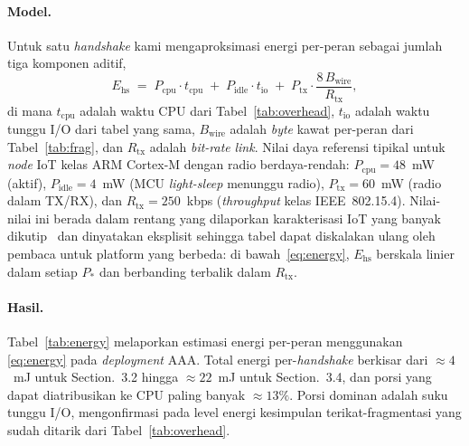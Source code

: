 \documentclass{easychair}
\newcommand{\VarSecShort}[1]{Section.~#1}
\begin{document}
\paragraph{Model.} Untuk satu \emph{handshake} kami mengaproksimasi
energi per-peran sebagai jumlah tiga komponen aditif,
\begin{equation}
E_{\mathrm{hs}} \;=\; P_{\mathrm{cpu}}\cdot t_{\mathrm{cpu}}
\;+\; P_{\mathrm{idle}}\cdot t_{\mathrm{io}}
\;+\; P_{\mathrm{tx}}\cdot \frac{8\,B_{\mathrm{wire}}}{R_{\mathrm{tx}}},
\label{eq:energy}
\end{equation}
di mana $t_{\mathrm{cpu}}$ adalah waktu CPU dari
Tabel~\ref{tab:overhead}, $t_{\mathrm{io}}$ adalah waktu tunggu I/O
dari tabel yang sama, $B_{\mathrm{wire}}$ adalah \emph{byte} kawat
per-peran dari Tabel~\ref{tab:frag}, dan $R_{\mathrm{tx}}$ adalah
\emph{bit-rate} \emph{link}. Nilai daya referensi tipikal untuk
\emph{node} IoT kelas ARM Cortex-M dengan radio berdaya-rendah:
$P_{\mathrm{cpu}}\!=\!48$~mW (aktif),
$P_{\mathrm{idle}}\!=\!4$~mW (MCU \emph{light-sleep} menunggu radio),
$P_{\mathrm{tx}}\!=\!60$~mW (radio dalam TX/RX), dan
$R_{\mathrm{tx}}\!=\!250$~kbps (\emph{throughput} kelas IEEE~802.15.4).
Nilai-nilai ini berada dalam rentang yang dilaporkan karakterisasi
IoT yang banyak dikutip~\cite{FVW24,FTK+25} dan dinyatakan eksplisit
sehingga tabel dapat diskalakan ulang oleh pembaca untuk platform
yang berbeda: di bawah~\eqref{eq:energy}, $E_{\mathrm{hs}}$ berskala
linier dalam setiap $P_*$ dan berbanding terbalik dalam
$R_{\mathrm{tx}}$.

\paragraph{Hasil.} Tabel~\ref{tab:energy} melaporkan estimasi energi
per-peran menggunakan \eqref{eq:energy} pada \emph{deployment} AAA.
Total energi per-\emph{handshake} berkisar dari $\approx\!4$~mJ untuk
\VarSecShort{3.2} hingga $\approx\!22$~mJ untuk \VarSecShort{3.4}, dan
porsi yang dapat diatribusikan ke CPU paling banyak $\approx\!13\%$.
Porsi dominan adalah suku tunggu I/O, mengonfirmasi pada level energi
kesimpulan terikat-fragmentasi yang sudah ditarik dari
Tabel~\ref{tab:overhead}.
\end{document}
